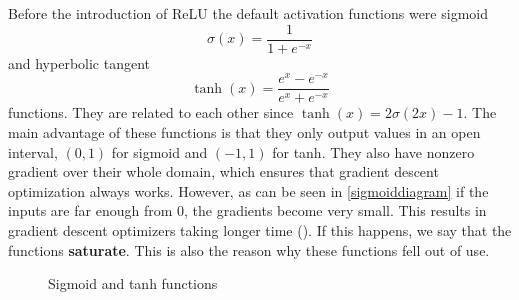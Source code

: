 Before the introduction of ReLU the default activation functions were sigmoid $$\sigma(x)=\frac{1}{1+e^{-x}}$$ and hyperbolic tangent $$\tanh(x)=\frac{e^x-e^{-x}}{e^x+e^{-x}}$$ functions. They are related to each other since $\tanh(x)=2\sigma(2x)-1$. The main advantage of these functions is that they only output values in an open interval, $(0,1)$ for sigmoid and $(-1,1)$ for tanh. They also have nonzero gradient over their whole domain, which ensures that gradient descent optimization always works. However, as can be seen in \autoref{sigmoiddiagram} if the inputs are far enough from $0$, the gradients become very small. This results in gradient descent optimizers taking longer time (\cite{imagenet_relu}). If this happens, we say that the functions \textbf{saturate}. This is also the reason why these functions fell out of use.
\begin{figure}[t]
\caption{Sigmoid and tanh functions}
\center
\label{sigmoiddiagram}
\end{figure}

